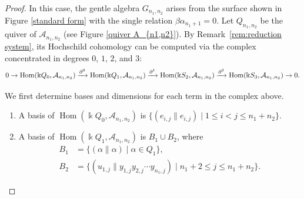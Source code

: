 \documentclass[a4paper, reqno, 11pt]{amsart}
\theoremstyle{definition}
\begin{document}
\begin{proof}
	In this case, the gentle algebra $G_{n_1,n_2}$ arises from the surface shown in Figure \ref{standard form} with the single relation $\beta\alpha_{n_1+1}=0$. 
	Let $Q_{n_1,n_2}$ be the quiver of $\mathcal{A}_{n_1,n_2}$ (see Figure \ref{quiver A_{n1,n2}}). 
	By Remark~\ref{rem:reduction system}, its Hochschild cohomology can be computed via the complex concentrated in degrees $0$, $1$, $2$, and $3$:
	\[
	\scalebox{0.95}{$
		0 \to \operatorname{Hom}(\Bbbk Q_0, \mathcal{A}_{n_1,n_2}) \xrightarrow{\partial^0} 
		\operatorname{Hom}(\Bbbk Q_1, \mathcal{A}_{n_1,n_2}) \xrightarrow{\partial^1} 
		\operatorname{Hom}(\Bbbk S_2, \mathcal{A}_{n_1,n_2}) \xrightarrow{\partial^2} 
		\operatorname{Hom}(\Bbbk S_3, \mathcal{A}_{n_1,n_2}) \to 0.
		$}
	\]
	
	We first determine bases and dimensions for each term in the complex above.
	\allowdisplaybreaks
	\begin{enumerate}[label=(\alph*), leftmargin=*, itemindent=0pt, labelindent=0pt, labelsep=0.5em]
		\item A basis of $\operatorname{Hom}(\Bbbk Q_0, \mathcal{A}_{n_1,n_2})$ is
		\(
		\{(e_{i,j} \parallel e_{i,j}) \mid 1 \leq i < j \leq n_1+n_2\}.
		\)
		
		\item A basis of $\operatorname{Hom}(\Bbbk Q_1, \mathcal{A}_{n_1,n_2})$ is $B_1 \cup B_2$, where
		\begin{align*}
			B_1 &= \{(\alpha \parallel \alpha) \mid \alpha \in Q_1\}, \\
			B_2 &= \{(u_{1,j} \parallel y_{1,j}y_{2,j}\cdots y_{n_1,j}) \mid n_1+2 \le j \le n_1+n_2\}.
		\end{align*}
		

\end{enumerate}
\end{proof}
\end{document}
